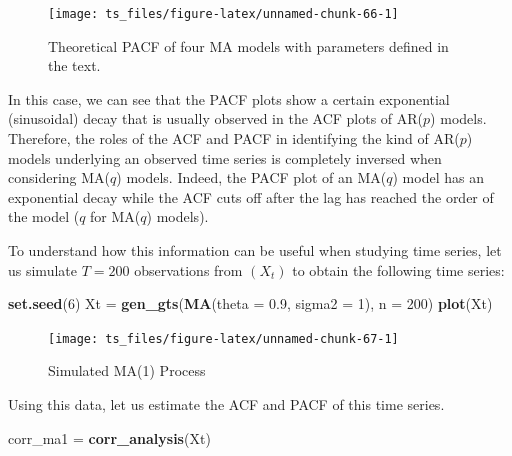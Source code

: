 \documentclass[]{book}
\newenvironment{Shaded}{\begin{snugshade}}{\end{snugshade}}
\newcommand{\KeywordTok}[1]{\textcolor[rgb]{0.13,0.29,0.53}{\textbf{#1}}}
\newcommand{\DataTypeTok}[1]{\textcolor[rgb]{0.13,0.29,0.53}{#1}}
\newcommand{\DecValTok}[1]{\textcolor[rgb]{0.00,0.00,0.81}{#1}}
\newcommand{\FloatTok}[1]{\textcolor[rgb]{0.00,0.00,0.81}{#1}}
\newcommand{\StringTok}[1]{\textcolor[rgb]{0.31,0.60,0.02}{#1}}
\newcommand{\NormalTok}[1]{#1}
\theoremstyle{definition}
\theoremstyle{definition}
\theoremstyle{definition}
\theoremstyle{remark}
\begin{document}
\begin{figure}

{\centering \texttt{[image: ts\_files/figure-latex/unnamed-chunk-66-1]} 

}

\caption{Theoretical PACF of four MA models with parameters defined in the text.}\label{fig:unnamed-chunk-66}
\end{figure}

In this case, we can see that the PACF plots show a certain exponential
(sinusoidal) decay that is usually observed in the ACF plots of
AR(\(p\)) models. Therefore, the roles of the ACF and PACF in
identifying the kind of AR(\(p\)) models underlying an observed time
series is completely inversed when considering MA(\(q\)) models. Indeed,
the PACF plot of an MA(\(q\)) model has an exponential decay while the
ACF cuts off after the lag has reached the order of the model (\(q\) for
MA(\(q\)) models).

To understand how this information can be useful when studying time
series, let us simulate \(T = 200\) observations from \((X_t)\) to
obtain the following time series:

\begin{Shaded}
\begin{Highlighting}[]
\KeywordTok{set.seed}\NormalTok{(}\DecValTok{6}\NormalTok{)}
\NormalTok{Xt =}\StringTok{ }\KeywordTok{gen_gts}\NormalTok{(}\KeywordTok{MA}\NormalTok{(}\DataTypeTok{theta =} \FloatTok{0.9}\NormalTok{, }\DataTypeTok{sigma2 =} \DecValTok{1}\NormalTok{), }\DataTypeTok{n =} \DecValTok{200}\NormalTok{)}
\KeywordTok{plot}\NormalTok{(Xt)}
\end{Highlighting}
\end{Shaded}

\begin{figure}

{\centering \texttt{[image: ts\_files/figure-latex/unnamed-chunk-67-1]} 

}

\caption{Simulated MA(1) Process}\label{fig:unnamed-chunk-67}
\end{figure}

Using this data, let us estimate the ACF and PACF of this time series.

\begin{Shaded}
\begin{Highlighting}[]
\NormalTok{corr_ma1 =}\StringTok{ }\KeywordTok{corr_analysis}\NormalTok{(Xt)}
\end{Highlighting}
\end{Shaded}
\end{document}
